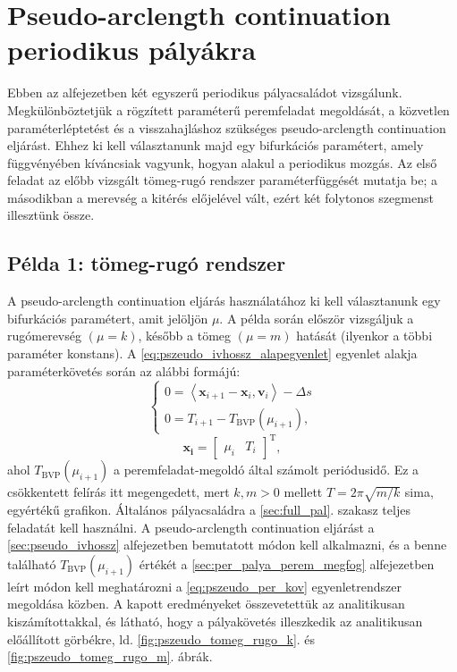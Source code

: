 \section{Pseudo-arclength continuation periodikus pályákra}

Ebben az alfejezetben két egyszerű periodikus pályacsaládot vizsgálunk. Megkülönböztetjük a rögzített paraméterű peremfeladat megoldását, a közvetlen paraméterléptetést és a visszahajláshoz szükséges pseudo-arclength continuation eljárást.
Ehhez ki kell választanunk majd egy bifurkációs paramétert, amely függvényében kíváncsiak vagyunk, hogyan alakul a periodikus mozgás.
Az első feladat az előbb vizsgált tömeg-rugó rendszer paraméterfüggését mutatja be; a másodikban a merevség a kitérés előjelével vált, ezért két folytonos szegmenst illesztünk össze.

\subsection{Példa 1: tömeg-rugó rendszer}
\examplebody


A pseudo-arclength continuation eljárás használatához ki kell választanunk egy bi\-fur\-ká\-ci\-ós paramétert, amit jelöljön $\mu$.
A példa során először vizsgáljuk a rugómerevség $(\mu = k)$, később a tömeg $(\mu =m)$ hatását (ilyenkor a többi paraméter konstans).
A \eqref{eq:pszeudo_ivhossz_alapegyenlet} egyenlet alakja paraméterkövetés során az alábbi formájú:
\begin{equation}
\begin{cases}
0 = \left< \mathbf{x}_{i+1} - \mathbf{x}_i, \mathbf{v}_i \right> - \Delta s \\
0 = T_{i+1} - T_{\mathrm{BVP}}(\mu_{i+1}),
\end{cases}
\label{eq:pszeudo_per_kov}
\end{equation}
\begin{equation}
\mathbf{x_i}= \begin{bmatrix}
\mu_{i} & T_{i}
\end{bmatrix}^\mathrm{T},
\end{equation}
ahol $T_{\mathrm{BVP}}(\mu_{i+1})$ a peremfeladat-megoldó által számolt periódusidő. Ez a csökkentett felírás itt megengedett, mert $k,m>0$ mellett $T=2\pi\sqrt{m/k}$ sima, egyértékű grafikon. Általános pályacsaládra a \ref{sec:full_pal}. szakasz teljes feladatát kell használni.
A pseudo-arclength continuation eljárást a \ref{sec:pseudo_ivhossz} alfejezetben bemutatott módon kell alkalmazni, és a benne található $T_{\mathrm{BVP}}(\mu_{i+1})$ értékét a \ref{sec:per_palya_perem_megfog} alfejezetben leírt módon kell meghatározni a \eqref{eq:pszeudo_per_kov} egyenletrendszer megoldása közben.
A kapott eredményeket összevetettük az analitikusan kiszámítottakkal, és látható, hogy a pályakövetés illeszkedik az analitikusan előállított görbékre, ld. \ref{fig:pszeudo_tomeg_rugo_k}. és \ref{fig:pszeudo_tomeg_rugo_m}. ábrák.

